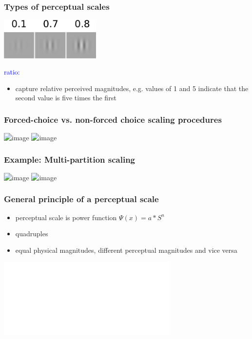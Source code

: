 \documentclass[]{beamer}
\begin{document}
\begin{frame}
 \frametitle{Types of perceptual scales}
\begin{overlayarea}{110mm}{60mm}
\begin{center}
\includegraphics[width=50mm]{figs/l6/three_contrasts.png} 
\end{center}

\textcolor{blue}{ratio:}
\begin{itemize}
 \item capture relative perceived magnitudes, e.g. values of 1 and 5 indicate that the second value is five times the first 
\end{itemize}
\end{overlayarea}
\end{frame}


\begin{frame}
 \frametitle{Forced-choice vs. non-forced choice scaling procedures}
\begin{center}
\includegraphics<1>[width=90mm]{figs/l6/appearance_fc.png} 
\includegraphics<2>[width=90mm]{figs/l6/appearance_nonfc.png} 
\end{center}
\end{frame}

\begin{frame}
 \frametitle{Example: Multi-partition scaling}
\begin{center}
\includegraphics<1>[width=70mm]{figs/l6/whittle_display.png} 
\includegraphics<2>[width=70mm]{figs/l6/whittle_scale.png} 
\end{center}
\end{frame}



\begin{frame}
 \frametitle{General principle of a perceptual scale}
 
\begin{itemize}
 \item perceptual scale is power function $\Psi(x) = a*S^n$
 \item quadruples
 \item equal physical magnitudes, different perceptual magnitudes and vice versa
\end{itemize}

\begin{center}
\includegraphics<1>[width=90mm]{figs/l6/scale_power_function.pdf} 
\end{center}
\end{frame}
\end{document}
